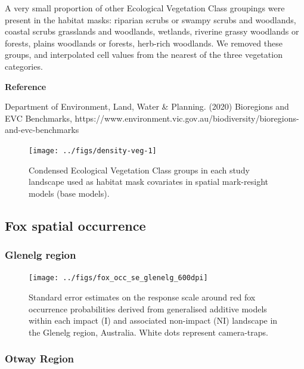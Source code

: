 \documentclass[preprint, 3p, authoryear]{elsarticle} %
\begin{document}
A very small proportion of other Ecological Vegetation Class groupings were present in the habitat masks: riparian scrubs or swampy scrubs and woodlands, coastal scrubs grasslands and woodlands, wetlands, riverine grassy woodlands or forests, plains woodlands or forests, herb-rich woodlands. We removed these groups, and interpolated cell values from the nearest of the three vegetation categories.

\textbf{Reference}

Department of Environment, Land, Water \& Planning. (2020) Bioregions and EVC Benchmarks, https://www.environment.vic.gov.au/biodiversity/bioregions-and-evc-benchmarks

\newpage

\begin{figure}

{\centering \texttt{[image: ../figs/density-veg-1]} 

}

\caption{Condensed Ecological Vegetation Class groups in each study landscape used as habitat mask covariates in spatial mark-resight models (base models).}\label{fig:density-veg}
\end{figure}

\newpage

\hypertarget{density-app-fox}{%
\subsection{Fox spatial occurrence}\label{density-app-fox}}

\hypertarget{glenelg-region-1}{%
\subsubsection{Glenelg region}\label{glenelg-region-1}}

\begin{figure}

{\centering \texttt{[image: ../figs/fox\_occ\_se\_glenelg\_600dpi]} 

}

\caption{Standard error estimates on the response scale around red fox occurrence probabilities derived from generalised additive models within each impact (I) and associated non-impact (NI) landscape in the Glenelg region, Australia. White dots represent camera-traps.}\label{fig:density-fox-se-g}
\end{figure}

\newpage

\hypertarget{otway-region-1}{%
\subsubsection{Otway Region}\label{otway-region-1}}
\end{document}
